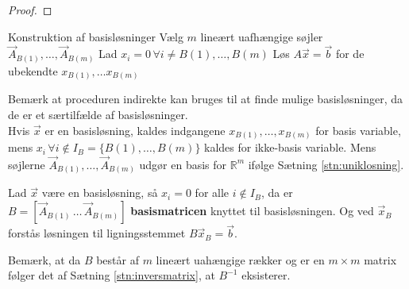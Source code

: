 \begin{proof}
%
\end{proof}

\begin{pro}{Konstruktion af basisløsninger}
Vælg $m$ lineært uafhængige søjler $\vec{A}_{B(1)},\dots,\vec{A}_{B(m)}$
Lad $x_i=0 \,\forall i\neq B(1),\dots,B(m)$
Løs $A\vec{x}=\vec{b}$ for de ubekendte $x_{B(1)},\dots x_{B(m)}$
\end{pro}
Bemærk at proceduren indirekte kan bruges til at finde mulige basisløsninger, da de er et særtilfælde af basisløsninger.\\

Hvis $\vec{x}$ er en basisløsning, kaldes indgangene $x_{B(1)},\dots ,x_{B(m)}$ for basis variable, mens $x_i \,\forall i\notin I_B=\{ B(1),\dots,B(m)\}$ kaldes for ikke-basis variable. Mens søjlerne $\vec{A}_{B(1)},\dots,\vec{A}_{B(m)}$ udgør en basis for $\mathds{R}^m$ ifølge Sætning \ref{stn:uniklosning}.
\begin{defn}
Lad $\vec{x}$ være en basisløsning, så $x_i = 0$ for alle $i \notin I_B$, da er $B = [\vec{A}_{B(1)}\,\dots\, \vec{A}_{B(m)}]$ \textbf{basismatricen} knyttet til basisløsningen. 
Og ved $\vec{x}_B$ forstås løsningen til ligningsstemmet $B\vec{x}_B =\vec{b}$.
\end{defn}
Bemærk, at da $B$ består af $m$ lineært uahængige rækker og er en $m\times m$ matrix følger det af Sætning \ref{stn:inversmatrix}, at $B^{-1}$ eksisterer. 


